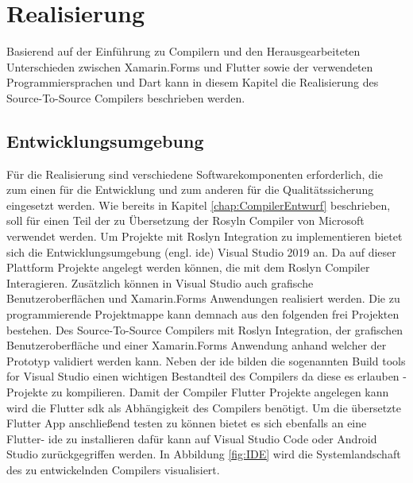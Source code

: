 \chapter{Realisierung}
\label{chap:Realisierung}

Basierend auf der Einführung zu Compilern und den Herausgearbeiteten Unterschieden zwischen Xamarin.Forms und Flutter sowie der verwendeten Programmiersprachen \Csharp und Dart kann in diesem Kapitel die Realisierung des Source-To-Source Compilers beschrieben werden. 

\section{Entwicklungsumgebung }
Für die Realisierung sind verschiedene Softwarekomponenten erforderlich,  die zum einen für die Entwicklung und zum anderen für die Qualitätssicherung eingesetzt werden.  Wie bereits in Kapitel \ref{chap:CompilerEntwurf} beschrieben,  soll für einen Teil der zu Übersetzung der Rosyln Compiler von Microsoft verwendet werden.  Um Projekte mit Roslyn Integration zu implementieren bietet sich die Entwicklungsumgebung (engl.  \ac{ide}) Visual Studio 2019 an.  Da auf dieser  Plattform Projekte angelegt werden können,  die mit dem Roslyn Compiler Interagieren.  Zusätzlich können in Visual Studio auch grafische Benutzeroberflächen und Xamarin.Forms Anwendungen realisiert werden.  Die zu programmierende Projektmappe kann demnach aus den folgenden frei Projekten bestehen.  Des Source-To-Source Compilers mit Roslyn Integration, der grafischen Benutzeroberfläche und einer Xamarin.Forms Anwendung anhand welcher der Prototyp validiert werden kann.  Neben der \ac{ide} bilden die sogenannten Build tools for Visual Studio einen wichtigen Bestandteil des Compilers da diese es erlauben \Csharp -Projekte zu kompilieren.  Damit der Compiler Flutter Projekte angelegen kann wird die Flutter \ac{sdk} als Abhängigkeit des Compilers benötigt.  Um die übersetzte Flutter App anschließend testen zu können bietet es sich ebenfalls an eine Flutter- \ac{ide} zu installieren dafür kann auf Visual Studio Code oder Android Studio zurückgegriffen werden.  In Abbildung \ref{fig:IDE} wird die Systemlandschaft des zu entwickelnden Compilers visualisiert. 

